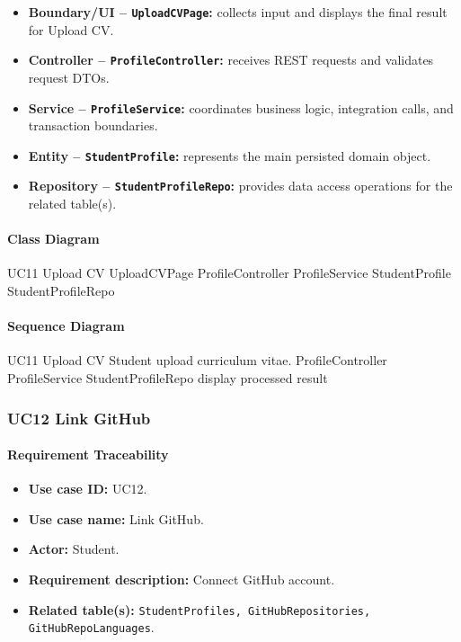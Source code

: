 \begin{itemize}
    \item \textbf{Boundary/UI -- \texttt{UploadCVPage}:} collects input and displays the final result for Upload CV.
    \item \textbf{Controller -- \texttt{ProfileController}:} receives REST requests and validates request DTOs.
    \item \textbf{Service -- \texttt{ProfileService}:} coordinates business logic, integration calls, and transaction boundaries.
    \item \textbf{Entity -- \texttt{StudentProfile}:} represents the main persisted domain object.
    \item \textbf{Repository -- \texttt{StudentProfileRepo}:} provides data access operations for the related table(s).
\end{itemize}

\paragraph{Class Diagram}

\ClassDiagram
{UC11 Upload CV}
{UploadCVPage}
{ProfileController}
{ProfileService}
{StudentProfile}
{StudentProfileRepo}

\paragraph{Sequence Diagram}

\SequenceDiagram
{UC11 Upload CV}
{Student}
{upload curriculum vitae.}
{ProfileController}
{ProfileService}
{StudentProfileRepo}
{display processed result}

\subsubsection{UC12 Link GitHub}

\paragraph{Requirement Traceability}

\begin{itemize}
    \item \textbf{Use case ID:} UC12.
    \item \textbf{Use case name:} Link GitHub.
    \item \textbf{Actor:} Student.
    \item \textbf{Requirement description:} Connect GitHub account.
    \item \textbf{Related table(s):} \texttt{StudentProfiles, GitHubRepositories, GitHubRepoLanguages}.
\end{itemize}

